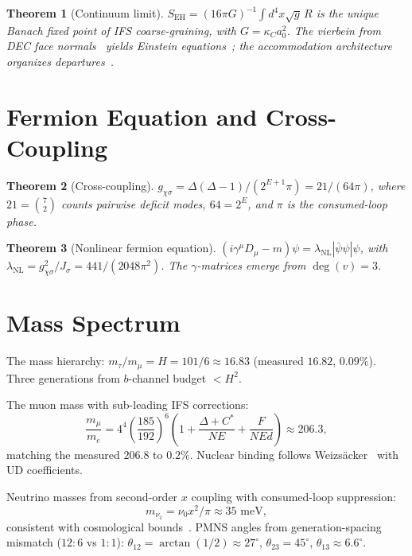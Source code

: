 \documentclass[11pt,twocolumn]{article}
\newtheorem{theorem}{Theorem}
\begin{document}
\begin{theorem}[Continuum limit]
$S_{\mathrm{EH}}=(16\pi G)^{-1}\!\int d^4x\sqrt{g}\,R$ is the unique Banach fixed point of IFS coarse-graining, with $G=\kappa_C a_0^2$.
The vierbein from DEC face normals~\cite{hirani2003} yields Einstein equations~\cite{einstein1915}; the accommodation architecture organizes departures~\cite{mayes2026grav}.
\end{theorem}


\section{Fermion Equation and Cross-Coupling}
\label{sec:fermion}

\begin{theorem}[Cross-coupling]
$g_{\chi\sigma}=\Delta(\Delta{-}1)/(2^{E+1}\pi)=21/(64\pi)$, where $21=\binom{7}{2}$ counts pairwise deficit modes, $64=2^E$, and $\pi$ is the consumed-loop phase.
\end{theorem}

\begin{theorem}[Nonlinear fermion equation]
$(i\gamma^\mu D_\mu-m)\psi=\lambda_{\mathrm{NL}}|\bar\psi\psi|\psi$, with $\lambda_{\mathrm{NL}}=g_{\chi\sigma}^2/J_\sigma=441/(2048\pi^2)$.
The $\gamma$-matrices emerge from $\deg(v)=3$.
\end{theorem}

\section{Mass Spectrum}
\label{sec:mass}

The mass hierarchy: $m_\tau/m_\mu=H=101/6\approx 16.83$ (measured $16.82$, $0.09\%$).
Three generations from $b$-channel budget $<H^2$.

The muon mass with sub-leading IFS corrections:
\begin{equation}
\frac{m_\mu}{m_e} = 4^4\!\left(\frac{185}{192}\right)^{\!6}\!\left(1+\frac{\Delta{+}C^*}{NE}+\frac{F}{NEd}\right)\approx 206.3,
\label{eq:muon}
\end{equation}
matching the measured $206.8$ to $0.2\%$.
Nuclear binding follows Weizs\"acker~\cite{weizsacker1935} with UD coefficients.

Neutrino masses from second-order $x$ coupling with consumed-loop suppression:
\begin{equation}
m_{\nu_1} = \nu_0 x^2/\pi \approx 35\text{ meV},
\label{eq:neutrino}
\end{equation}
consistent with cosmological bounds~\cite{planck2018}.
PMNS angles from generation-spacing mismatch ($12{:}6$ vs $1{:}1$):
$\theta_{12}=\arctan(1/2)\approx 27^\circ$, $\theta_{23}=45^\circ$, $\theta_{13}\approx 6.6^\circ$.
\end{document}
